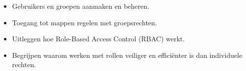 \begin{itemize}
\item Gebruikers en groepen aanmaken en beheren.
\item Toegang tot mappen regelen met groepsrechten.
\item Uitleggen hoe Role-Based Access Control (RBAC) werkt.
\item Begrijpen waarom werken met rollen veiliger en efficiënter is dan individuele rechten.
\end{itemize}
